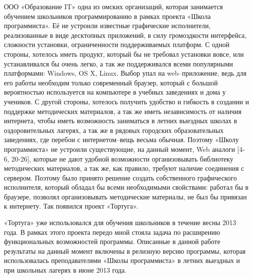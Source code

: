 ООО «Образование IT» одна из омских организаций, которая занимается обучением школьников программированию в рамках проекта «Школа программиста». Её не устроили известные графические исполнители, реализованные в виде десктопных приложений, в силу громоздкости интерфейса, сложности установки, ограниченности поддерживаемых платформ. С одной стороны, хотелось иметь продукт, который бы не требовал установки вовсе, или устанавливался бы очень легко, а так же поддерживался всеми популярными платформами: Windows, OS X, Linux. Выбор упал на web–приложение, ведь для его работы необходим только современный браузер, который с большой вероятностью используется на компьютере в учебных заведениях и дома у учеников. С другой стороны, хотелось получить удобство и гибкость в создании и поддержке методических материалов, а так же иметь независимость от наличия интернета, чтобы иметь возможность заниматься в летних выездных школах в оздоровительных лагерях, а так же в рядовых городских образовательных заведениях, где перебои с интернетом–вещь весьма обычная. Поэтому «Школу программиста» не устроили существующие, на данный момент, Web аналоги [4-6, 20-26], которые не дают удобной возможности организовывать библиотеку методических материалов, а так же, как правило, требуют наличие соединения с сервером. Поэтому было принято решение создать собственного графического исполнителя, который обладал бы всеми необходимыми свойствами: работал бы в браузере, позволял организовывать методические материалы, не был бы привязан к интернету. Так появился проект «Тортуга».\par
«Тортуга» уже использовался для обучения школьников в течение весны 2013 года. В рамках этого проекта передо мной стояла задача по расширению функциональных возможностей программы. Описанные в данной работе результаты на данный момент включены в релизную версию программы, которая использовалась преподавателями «Школы программиста» в летних выездных и при школьных лагерях в июне 2013 года.


\clearpage